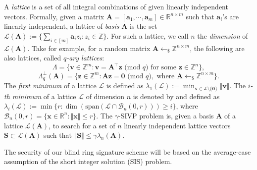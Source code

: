 \documentclass[runningheads]{llncs}
\begin{document}
  
A \textit{lattice} is a set of all integral combinations of given linearly independent vectors. Formally, given a matrix $\mathbf{A}=[\mathbf{a}_1, \cdots, \mathbf{a}_m]\in \mathbb{R}^{n \times m}$ such that $\mathbf{a}_i$'s are linearly independent, a lattice of \textit{basis} $\mathbf{A}$ is the set
$\mathcal{L}(\mathbf{A}):=\{\sum_{i \in [m]}\mathbf{a}_iz_i: z_i\in \mathbb{Z}\}$. For such a lattice, we call $n$ the \textit{dimension} of $\mathcal{L}(\mathbf{A})$.
   Take for example, for a random matrix $\mathbf{A} \leftarrow_{\$} \mathbb{Z}^{n \times m}$, the following are also lattices, called \textit{$q$-ary lattices}: $$\Lambda=\{\mathbf{v} \in \mathbb{Z}^m: \mathbf{v}=\mathbf{A}^{\top}\mathbf{z} \text{ (mod } q) \text { for some } \mathbf{z} \in \mathbb{Z}^{n} \},$$  \begin{equation}\label{eq}    \Lambda_q^{\bot}(\mathbf{A})=\{\mathbf{z} \in \mathbb{Z}^m: \mathbf{A}\mathbf{z}=\mathbf{0} \text{ (mod } q), \text{ where } \mathbf{A} \leftarrow_{\$} \mathbb{Z}^{n \times m} \}.   \end{equation}
The \textit{first minimum} of a lattice $\mathcal{L}$ is defined as      $\lambda_1(\mathcal{L}):=\min_{\mathbf{v} \in \mathcal{L} \setminus \{\textbf{0}\}}\Vert \mathbf{v}\Vert$. The \textit{$i$-th minimum} of a lattice $\mathcal{L}$ of dimension $n$ is denoted by and defined as      $\lambda_i(\mathcal{L}):=\min\{r: \dim(\text{span}(\mathcal{L} \cap \mathcal{B}_n(0,r))) \geq i\}$, where $\mathcal{B}_n(0,r)=\{\mathbf{x} \in \mathbb{R}^n: \Vert \mathbf{x}\Vert \leq r \}$.   
The $\gamma$-\textsf{SIVP} problem is, given a basis $\mathbf{A}$ of a lattice $ \mathcal{L}(\mathbf{A}) $, to search for a set of $n$ linearly independent lattice vectors $\mathbf{S} \subset \mathcal{L}(\mathbf{A})$ such that $\Vert  \mathbf{S} \Vert \leq \gamma \lambda_n(\mathbf{A})$. 


The security of our blind ring signature scheme will be based on the average-case assumption of the short integer solution (\textsf{SIS}) problem. 
\end{document}
